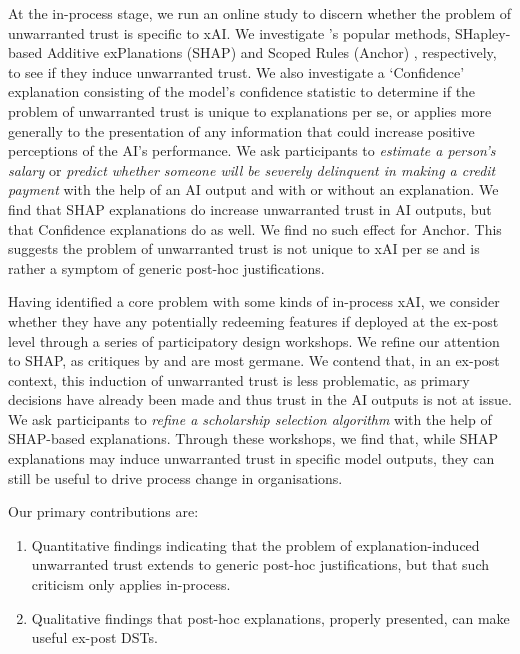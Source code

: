 At the in-process stage, we run an online study to discern whether the problem of unwarranted trust is specific to xAI. We investigate \textcite{lundberg_unified_2017,ribeiro_anchors_2018}'s popular methods, SHapley-based Additive exPlanations (SHAP) \cite{lundberg_unified_2017} and Scoped Rules (Anchor) \cite{ribeiro_anchors_2018}, respectively, to see if they induce unwarranted trust. We also investigate a `Confidence' explanation consisting of the model's confidence statistic to determine if the problem of unwarranted trust is unique to explanations per se, or applies more generally to the presentation of any information that could increase positive perceptions of the AI's performance. We ask participants to \emph{estimate a person's salary} \cite{kohavi_scaling_1996} or \emph{predict whether someone will be severely delinquent in making a credit payment} \cite{GiveMeSomeCredit} with the help of an AI output and with or without an explanation. We find that SHAP explanations do increase unwarranted trust in AI outputs, but that Confidence explanations do as well. We find no such effect for Anchor. This suggests the problem of unwarranted trust is not unique to xAI per se and is rather a symptom of generic post-hoc justifications.

Having identified a core problem with some kinds of in-process xAI, we consider whether they have any potentially redeeming features if deployed at the ex-post level through a series of participatory design workshops. We refine our attention to SHAP, as critiques by \textcite{Lipton} and \textcite{miller_explainable_2023} are most germane. We contend that, in an ex-post context, this induction of unwarranted trust is less problematic, as primary decisions have already been made and thus trust in the AI outputs is not at issue. We ask participants to \emph{refine a scholarship selection algorithm} with the help of SHAP-based explanations. Through these workshops, we find that, while SHAP explanations may induce unwarranted trust in specific model outputs, they can still be useful to drive process change in organisations.

Our primary contributions are:

\begin{enumerate}
    \item Quantitative findings indicating that the problem of explanation-induced unwarranted trust extends to generic post-hoc justifications, but that such criticism only applies in-process.
    \item Qualitative findings that post-hoc explanations, properly presented, can make useful ex-post DSTs.
\end{enumerate}

